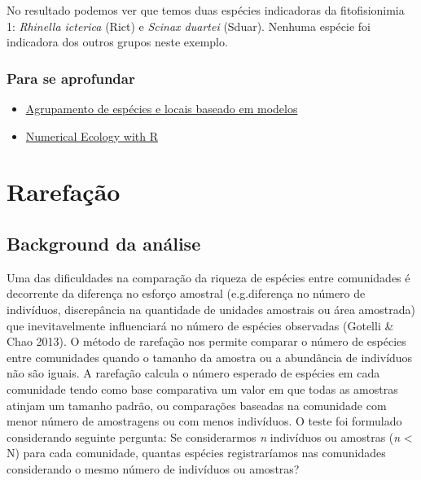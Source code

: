 \documentclass[
]{book}
\providecommand{\tightlist}{%
  \setlength{\itemsep}{0pt}\setlength{\parskip}{0pt}}
\begin{document}
No resultado podemos ver que temos duas espécies indicadoras da fitofisionimia 1: \emph{Rhinella icterica} (Rict) e \emph{Scinax duartei} (Sduar). Nenhuma espécie foi indicadora dos outros grupos neste exemplo.

\hypertarget{para-se-aprofundar}{%
\subsection{Para se aprofundar}\label{para-se-aprofundar}}

\begin{itemize}
\tightlist
\item
  \href{https://www.sciencedirect.com/science/article/pii/S0304380010006393?casa_token=0YLFbVbGj1IAAAAA:RFcrLHBDdt-NY5gpxCEAqlc8LMG0ayzChpMvaOFQkE10ftg2Us6PafgMQCSmCZZ21eb430e_lWo}{Agrupamento de espécies e locais baseado em modelos}
\item
  \href{http://adn.biol.umontreal.ca/~numericalecology/numecolR/}{Numerical Ecology with R}
\end{itemize}

\hypertarget{rarefauxe7uxe3o}{%
\chapter{Rarefação}\label{rarefauxe7uxe3o}}

\hypertarget{background-da-anuxe1lise}{%
\section{Background da análise}\label{background-da-anuxe1lise}}

Uma das dificuldades na comparação da riqueza de espécies entre comunidades é decorrente da diferença no esforço amostral (e.g.diferença no número de indivíduos, discrepância na quantidade de unidades amostrais ou área amostrada) que inevitavelmente influenciará no número de espécies observadas (Gotelli \& Chao 2013). O método de rarefação nos permite comparar o número de espécies entre comunidades quando o tamanho da amostra ou a abundância de indivíduos não são iguais. A rarefação calcula o número esperado de espécies em cada comunidade tendo como base comparativa um valor em que todas as amostras atinjam um tamanho padrão, ou comparações baseadas na comunidade com menor número de amostragens ou com menos indivíduos. O teste foi formulado considerando seguinte pergunta: Se considerarmos \emph{n} indivíduos ou amostras (\emph{n} \textless{} N) para cada comunidade, quantas espécies registraríamos nas comunidades considerando o mesmo número de indivíduos ou amostras?
\end{document}
